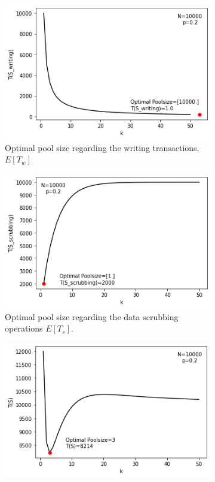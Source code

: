 \begin{figure}[b]%
    \centering
        \begin{subfigure}{6cm}
        \includegraphics[width=\linewidth]{graphics/expected_cost.png}
        \caption{Optimal pool size regarding the writing transactions. $E[T_w]$}\label{fig:expected_cost}
    \end{subfigure}
    \qquad
    \begin{subfigure}{6cm}
        \includegraphics[width=\linewidth]{graphics/expected_scrubbing.png}
        \caption{Optimal pool size regarding the data scrubbing operations $E[T_s]$.}\label{fig:expected_scrubbing}
    \end{subfigure}
    \qquad
    \begin{subfigure}{6cm}
        \includegraphics[width=\linewidth]{graphics/expected_operations.png}

\end{subfigure}
\end{figure}
